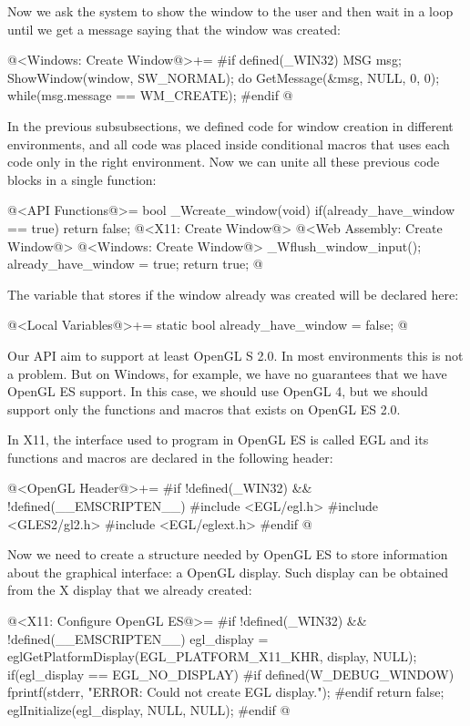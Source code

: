 Now we ask the system to show the window to the user and then wait in
a loop until we get a message saying that the window was created:

\iniciocodigo
@<Windows: Create Window@>+=
#if defined(_WIN32)
{
  MSG msg;
  ShowWindow(window, SW_NORMAL);
  do{
    GetMessage(&msg, NULL, 0, 0);
  } while(msg.message == WM_CREATE);
}
#endif
@
\fimcodigo


In the previous subsubsections, we defined code for window creation in
different environments, and all code was placed inside conditional
macros that uses each code only in the right environment. Now we can
unite all these previous code blocks in a single function:

\iniciocodigo
@<API Functions@>=
bool _Wcreate_window(void){
  if(already_have_window == true)
    return false;
  @<X11: Create Window@>
  @<Web Assembly: Create Window@>
  @<Windows: Create Window@>
  _Wflush_window_input();
  already_have_window = true;
  return true;
}
@
\fimcodigo

The variable that stores if the window already was created will be
declared here:

\iniciocodigo
@<Local Variables@>+=
static bool already_have_window = false;
@
\fimcodigo


Our API aim to support at least OpenGL S 2.0. In most environments
this is not a problem. But on Windows, for example, we have no
guarantees that we have OpenGL ES support. In this case, we should use
OpenGL 4, but we should support only the functions and macros that
exists on OpenGL ES 2.0.


In X11, the interface used to program in OpenGL ES is called EGL and
its functions and macros are declared in the following header:

\iniciocodigo
@<OpenGL Header@>+=
#if !defined(_WIN32) && !defined(__EMSCRIPTEN__)
#include <EGL/egl.h>
#include <GLES2/gl2.h>
#include <EGL/eglext.h>
#endif
@
\fimcodigo

Now we need to create a structure needed by OpenGL ES to store
information about the graphical interface: a OpenGL display. Such
display can be obtained from the X display that we already created:

\iniciocodigo
@<X11: Configure OpenGL ES@>=
#if !defined(_WIN32) && !defined(__EMSCRIPTEN__)
egl_display = eglGetPlatformDisplay(EGL_PLATFORM_X11_KHR, display,
                                    NULL);
if(egl_display == EGL_NO_DISPLAY){
#if defined(W_DEBUG_WINDOW)
  fprintf(stderr, "ERROR: Could not create EGL display.\n");
#endif
  return false;
}
eglInitialize(egl_display, NULL, NULL);
#endif
@
\fimcodigo

